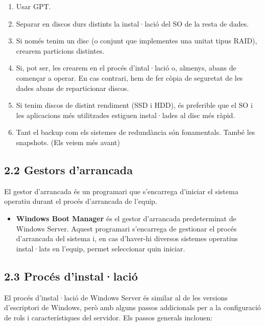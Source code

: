 \documentclass[
  a4paper,
]{article}
\providecommand{\tightlist}{%
  \setlength{\itemsep}{0pt}\setlength{\parskip}{0pt}}
\begin{document}
\begin{enumerate}
\def\labelenumi{\arabic{enumi}.}
\tightlist
\item
  Usar GPT.
\item
  Separar en discos durs distints la instal·lació del SO de la resta de
  dades.
\item
  Si només tenim un disc (o conjunt que implementes una unitat tipus
  RAID), crearem particions distintes.
\item
  Si, pot ser, les crearem en el procés d'intal·lació o, almenys, abans
  de començar a operar. En cas contrari, hem de fer còpia de seguretat
  de les dades abans de reparticionar discos.
\item
  Si tenim discos de distint rendiment (SSD i HDD), és preferible que el
  SO i les aplicacions més utilitzades estiguen instal·lades al disc més
  ràpid.
\item
  Tant el backup com els sistemes de redundància són fonamentals. També
  les snapshots. (Els veiem més avant)
\end{enumerate}

\subsection{2.2 Gestors d'arrancada}\label{gestors-darrancada}

El gestor d'arrancada és un programari que s'encarrega d'iniciar el
sistema operatiu durant el procés d'arrancada de l'equip.

\begin{itemize}
\tightlist
\item
  \textbf{Windows Boot Manager} és el gestor d'arrancada predeterminat
  de Windows Server. Aquest programari s'encarrega de gestionar el
  procés d'arrancada del sistema i, en cas d'haver-hi diversos sistemes
  operatius instal·lats en l'equip, permet seleccionar quin iniciar.
\end{itemize}

\subsection{2.3 Procés d'instal·lació}\label{procuxe9s-dinstallaciuxf3}

El procés d'instal·lació de Windows Server és similar al de les versions
d'escriptori de Windows, però amb alguns passos addicionals per a la
configuració de rols i característiques del servidor. Els passos
generals inclouen:
\end{document}
